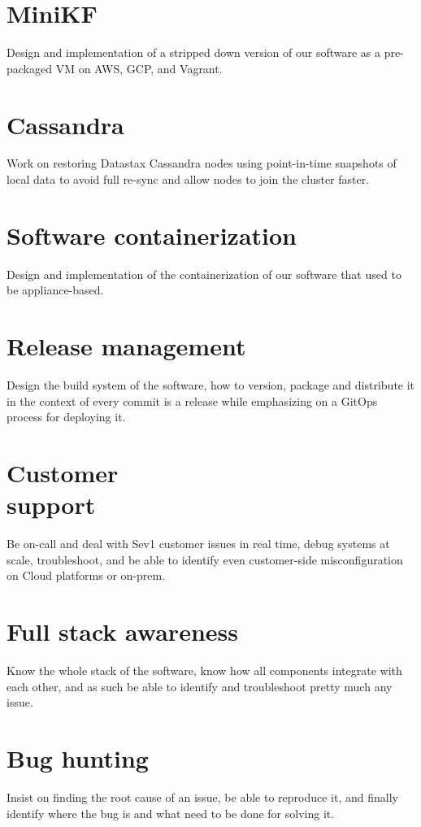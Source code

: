 \documentclass[margin,centered]{res}
\begin{document}
\begin{resume}
\section{\sc MiniKF}
Design and implementation of a stripped down version of our software as a
pre-packaged VM on AWS, GCP, and Vagrant.

\section{\sc Cassandra}
Work on restoring Datastax Cassandra nodes using point-in-time snapshots
of local data to avoid full re-sync and allow nodes to join the cluster faster.

\section{\sc Software containerization}
Design and implementation of the containerization of our software
that used to be appliance-based.

\section{\sc Release management}
Design the build system of the software, how to version, package and distribute
it in the context of every commit is a release while emphasizing on a GitOps
process for deploying it.

\section{\sc Customer\\support}
Be on-call and deal with Sev1 customer issues in real time, debug systems at
scale, troubleshoot, and be able to identify even customer-side
misconfiguration on Cloud platforms or on-prem.

\section{\sc Full stack awareness}
Know the whole stack of the software, know how all components integrate with
each other, and as such be able to identify and troubleshoot pretty much any
issue.

\section{\sc Bug hunting}
Insist on finding the root cause of an issue, be able to reproduce it, and
finally identify where the bug is and what need to be done for solving it.



\end{resume}
\end{document}
